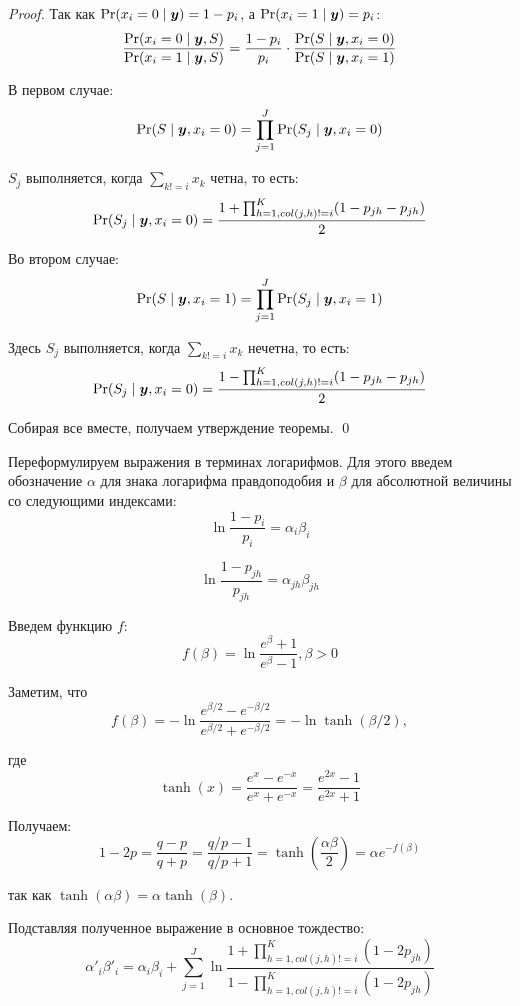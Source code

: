 \begin{proof}
	Так как $\Pr(x_i=0\mid \boldsymbol{y})=1-p_i$, а $\Pr(x_i=1\mid \boldsymbol{y})=p_i$:
	\begin{equation}
		\frac{\Pr(x_i=0\mid \boldsymbol{y},S)}{\Pr(x_i=1\mid \boldsymbol{y},S)}=\frac{1-p_i}{p_i} \cdot 
		\frac{\Pr(S\mid \boldsymbol{y},x_i=0)}{\Pr(S\mid \boldsymbol{y},x_i=1)}
	\end{equation}
	
	В первом случае:
	\begin{equation}
		\Pr(S\mid \boldsymbol{y},x_i=0)=\prod_{j=1}^J \Pr(S_j\mid \boldsymbol{y},x_i=0)
	\end{equation}
	
	$S_j$ выполняется, когда $\sum_{k!=i}x_k$ четна, то есть:
	\[
	\Pr(S_j\mid \boldsymbol{y},x_i=0)=\frac{1+\prod_{h=1, col(j,h)!=i}^K(1-p_{jh}-p_{jh})}{2}
	\]
	
	Во втором случае:
	\begin{equation}
		\Pr(S\mid \boldsymbol{y},x_i=1)=\prod_{j=1}^J \Pr(S_j\mid \boldsymbol{y},x_i=1)
	\end{equation}
	
	Здесь $S_j$ выполняется, когда $\sum_{k!=i}x_k$ нечетна, то есть:
	\[
	\Pr(S_j\mid \boldsymbol{y},x_i=0)=\frac{1-\prod_{h=1, col(j,h)!=i}^K(1-p_{jh}-p_{jh})}{2}
	\]
	
	Собирая все вместе, получаем утверждение теоремы. \qed
\end{proof}

Переформулируем выражения в терминах логарифмов. Для этого введем обозначение $\alpha$ для знака логарифма
правдоподобия и $\beta$ для абсолютной величины со следующими индексами:
\[
	\ln \frac{1-p_i}{p_i	} = \alpha_i \beta_i
\]

\[
	\ln \frac{1-p_{jh}}{p_{jh}} = \alpha_{jh} \beta_{jh}
\]

Введем функцию $f$:
\[
	f(\beta)=\ln \frac{e^{\beta}+1}{e^{\beta}-1}, \beta>0
\]

Заметим, что
\[
	f(\beta)=- \ln \frac{e^{\beta/2}-e^{-\beta/2}}{e^{\beta/2}+e^{-\beta/2}}=-\ln \tanh(\beta/2),
\]

где
\[
	\tanh(x) = \frac{e^x-e^{-x}}{e^x+e^{-x}}=\frac{e^{2x}-1}{e^{2x}+1}
\]

Получаем:
\[
1-2p = \frac{q-p}{q+p} = \frac{q/p - 1}{q/p + 1} = \tanh \left( \frac{\alpha \beta}{2} \right)
= \alpha e^{-f(\beta)}
\]

так как $\tanh(\alpha \beta) = \alpha \tanh(\beta)$.

Подставляя полученное выражение в основное тождество:
\[
		\alpha'_i \beta'_i= \alpha_i \beta_i + \sum_{j=1}^J 
		\ln \frac{1+\prod_{h=1,col(j,h)!=i}^{K}(1-2p_{jh})}{1-\prod_{h=1,col(j,h)!=i}^{K}(1-2p_{jh})}
\]

